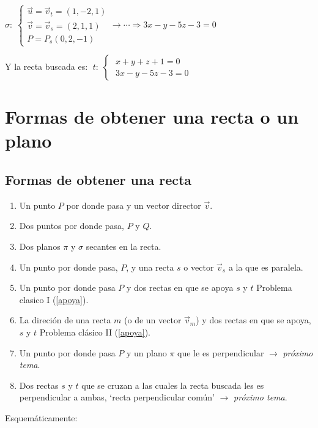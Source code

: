 $\sigma:\; \begin{cases} \vec u=\vec v_t=(1,-2,1) \\ \vec v=\vec v_s=(2,1,1) \\ P=P_s(0,2,-1) \end{cases} \to \cdots \Rightarrow 3x-y-5z-3=0$

Y la recta buscada es: $\;t:\;\begin{cases} \; x+y+z+1=0 \\ \; 3x-y-5z-3=0 \end{cases}$

\section{Formas de obtener una recta o un plano}

\subsection{Formas de obtener una recta}

\begin{enumerate}
\item Un punto $P$ por donde pasa y un vector director $\vec v$.
\item Dos puntos por donde pasa, $P$ y $Q$.
\item Dos planos $\pi$ y $\sigma$ secantes en la recta.
\item Un punto por donde pasa, $P$, y una recta $s$ o vector $\vec v_s$ a la que es paralela.
\item Un punto por donde pasa $P$ y dos rectas en que se apoya $s$ y $t$ \textcolor{gris}{Problema clasico I (\ref{apoya})}.
\item La direción de una recta $m$ (o de un vector $\vec v_m$) y dos rectas en que se apoya, $s$ y $t$ \textcolor{gris}{Problema clásico II (\ref{apoya})}.
\item Un punto por donde pasa $P$ y un plano $\pi$ que le es perpendicular $\to$ \textit{próximo tema}.
\item Dos rectas $s$ y $t$ que se cruzan a las cuales la recta buscada les es perpendicular a ambas, `recta perpendicular común' $\to$ \textit{próximo tema}.
\end{enumerate}

Esquemáticamente:


